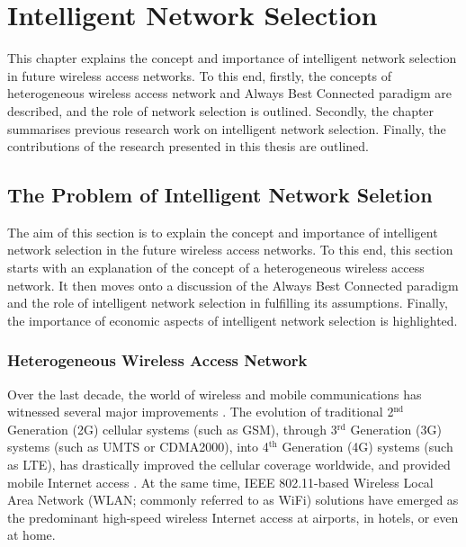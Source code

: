 \chapter{Intelligent Network Selection} %
\label{cha:intelligent}

This chapter explains the concept and importance of intelligent network selection in future wireless access networks. To this end, firstly, the concepts of heterogeneous wireless access network and Always Best Connected paradigm are described, and the role of network selection is outlined. Secondly, the chapter summarises previous research work on intelligent network selection. Finally, the contributions of the research presented in this thesis are outlined.

\section{The Problem of Intelligent Network Seletion} %
\label{sec:the_problem_of_intelligent_network_seletion_intelligent}
The aim of this section is to explain the concept and importance of intelligent network selection in the future wireless access networks. To this end, this section starts with an explanation of the concept of a heterogeneous wireless access network. It then moves onto a discussion of the Always Best Connected paradigm and the role of intelligent network selection in fulfilling its assumptions. Finally, the importance of economic aspects of intelligent network selection is highlighted.

\subsection{Heterogeneous Wireless Access Network} %
\label{sub:heterogeneous_wireless_access_network_intelligent}
Over the last decade, the world of wireless and mobile communications has witnessed several major improvements \cite{ABC03}. The evolution of traditional 2$^\text{nd}$ Generation (2G) cellular systems (such as GSM), through 3$^{\text{rd}}$ Generation (3G) systems (such as UMTS or CDMA2000), into 4$^{\text{th}}$ Generation (4G) systems (such as LTE), has drastically improved the cellular coverage worldwide, and provided mobile Internet access \cite{HossainBeaubrun09, HossainTalebiFard09}. At the same time, IEEE 802.11-based Wireless Local Area Network (WLAN; commonly referred to as WiFi) solutions have emerged as the predominant high-speed wireless Internet access at airports, in hotels, or even at home.

